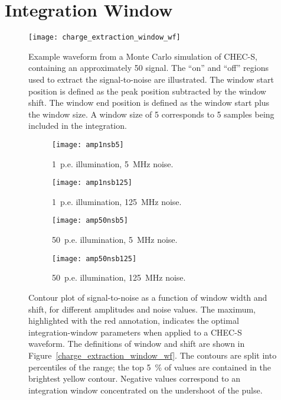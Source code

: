 \section{Integration Window}

\begin{figure}
  \texttt{[image: charge\_extraction\_window\_wf]}
  \caption[Definition of integration window on a waveform.]{Example waveform from a Monte Carlo simulation of CHEC-S, containing an approximately \SI{50}{\pe} signal. The ``on'' and ``off'' regions used to extract the signal-to-noise are illustrated. The window start position is defined as the peak position subtracted by the window shift. The window end position is defined as the window start plus the window size. A window size of 5 corresponds to 5 samples being included in the integration.}
  \label{fig:charge_extraction_window_wf}
\end{figure}

\begin{figure}
  \begin{subfigure}[b]{0.49\textwidth}
    \texttt{[image: amp1nsb5]}
    \caption{1~p.e. illumination, 5~MHz noise.}
    \label{fig:amp1nsb5}
  \end{subfigure}
  \hfill
  \begin{subfigure}[b]{0.49\textwidth}
    \texttt{[image: amp1nsb125]}
    \caption{1~p.e. illumination, 125~MHz noise.}
    \label{fig:amp1nsb125}
  \end{subfigure}
  \hfill
  \begin{subfigure}[b]{0.49\textwidth}
    \texttt{[image: amp50nsb5]}
    \caption{50~p.e. illumination, 5~MHz noise.}
    \label{fig:amp50nsb5}
  \end{subfigure}
  \hfill
  \begin{subfigure}[b]{0.49\textwidth}
    \texttt{[image: amp50nsb125]}
    \caption{50~p.e. illumination, 125~MHz noise.}
    \label{fig:amp50nsb125}
  \end{subfigure}
  \caption[Optimal integration-window parameters.]{Contour plot of signal-to-noise as a function of window width and shift, for different amplitudes and noise values. The maximum, highlighted with the red annotation, indicates the optimal integration-window parameters when applied to a CHEC-S waveform. The definitions of window and shift are shown in Figure~\ref{charge_extraction_window_wf}. The contours are split into percentiles of the range; the top \SI{5}{\percent} of values are contained in the brightest yellow contour. Negative values correspond to an integration window concentrated on the undershoot of the pulse.}
  \label{fig:snr_noc}
\end{figure}

